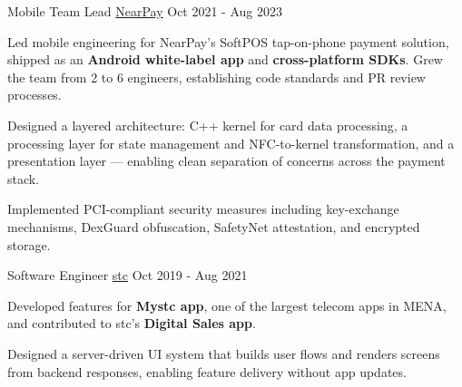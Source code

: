 \begin{cventries}
    \cventry
        {Mobile Team Lead}
        {\href{https://nearpay.io/}{NearPay}}
        {Oct 2021 - Aug 2023}
        {
            Led mobile engineering for NearPay's SoftPOS tap-on-phone payment solution, shipped as an \textbf{Android white-label app} and \textbf{cross-platform SDKs}. Grew the team from 2 to 6 engineers, establishing code standards and PR review processes.
            \begin{cvitems}
                \item {
                    Designed a layered architecture: C++ kernel for card data processing, a processing layer for state management and NFC-to-kernel transformation, and a presentation layer — enabling clean separation of concerns across the payment stack.
                }
                \item {
                    Implemented PCI-compliant security measures including key-exchange mechanisms, DexGuard obfuscation, SafetyNet attestation, and encrypted storage.
                }
            \end{cvitems}
        }

    \cventry
        {Software Engineer}
        {\href{https://www.stc.com.sa/}{stc}}
        {Oct 2019 - Aug 2021}
        {
            Developed features for \textbf{Mystc app}, one of the largest telecom apps in MENA, and contributed to stc's \textbf{Digital Sales app}.
            \begin{cvitems}
                \item {
                    Designed a server-driven UI system that builds user flows and renders screens from backend responses, enabling feature delivery without app updates.
                }
            \end{cvitems}
        }

\end{cventries}
